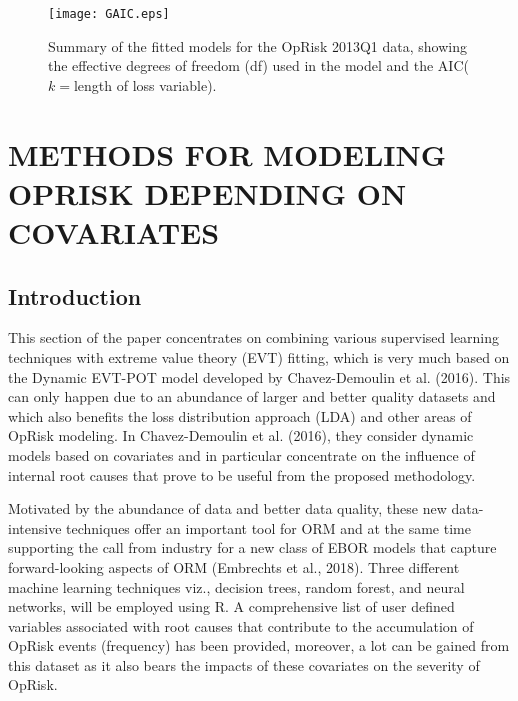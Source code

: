 \documentclass{DissertateUSU}
\begin{document}
\begin{figure}
\centering
\texttt{[image: GAIC.eps]}
\caption[Summary of fitted models]{Summary of the fitted models for the OpRisk 2013Q1 data, showing the effective degrees of freedom (df) used in the model and the AIC($k=$length of loss variable).}
\label{GAIC}
\end{figure}

\singlespacing

\FloatBarrier
\newpage
{}
\fancyhead[R]{\thepage}
\fancyfoot[C]{}

\chapter{METHODS FOR MODELING OPRISK DEPENDING ON COVARIATES}
\label{METHODS FOR MODELING OPRISK DEPENDING ON COVARIATES}

\doublespacing

\section{Introduction}
\label{sec:Introduction}

This section of the paper concentrates on combining various supervised
learning techniques with extreme value theory (EVT) fitting, which is
very much based on the Dynamic EVT-POT model developed by
Chavez-Demoulin et al. (2016). This can only happen due to an abundance
of larger and better quality datasets and which also benefits the loss
distribution approach (LDA) and other areas of OpRisk modeling. In
Chavez-Demoulin et al. (2016), they consider dynamic models based on
covariates and in particular concentrate on the influence of internal
root causes that prove to be useful from the proposed methodology.

Motivated by the abundance of data and better data quality, these new
data-intensive techniques offer an important tool for ORM and at the
same time supporting the call from industry for a new class of EBOR
models that capture forward-looking aspects of ORM (Embrechts et al.,
2018). Three different machine learning techniques viz., decision trees,
random forest, and neural networks, will be employed using R. A
comprehensive list of user defined variables associated with root causes
that contribute to the accumulation of OpRisk events (frequency) has
been provided, moreover, a lot can be gained from this dataset as it
also bears the impacts of these covariates on the severity of OpRisk.
\end{document}
